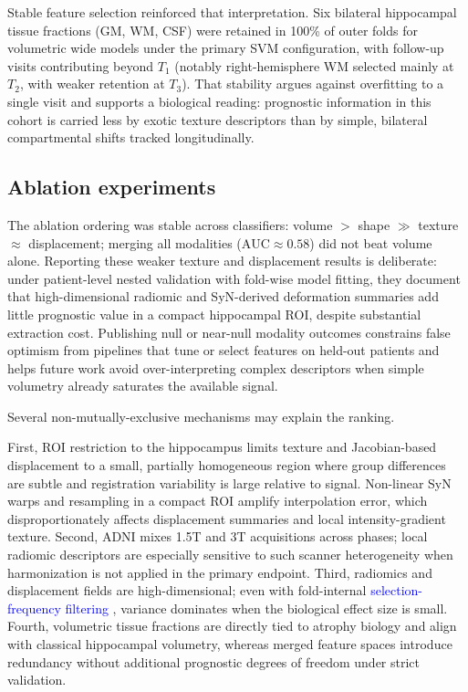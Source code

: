 \documentclass[review]{elsarticle}
\newcommand{\corrigir}[2]{%
	\textcolor{red}{\sout{#1}} %
	\textcolor{blue}{#2}%
}
\begin{document}
	Stable feature selection reinforced that interpretation. Six bilateral hippocampal tissue fractions (GM, WM, CSF) were retained in 100\% of outer folds for volumetric wide models under the primary SVM configuration, with follow-up visits contributing beyond $T_1$ (notably right-hemisphere WM selected mainly at $T_2$, with weaker retention at $T_3$). That stability argues against overfitting to a single visit and supports a biological reading: prognostic information in this cohort is carried less by exotic texture descriptors than by simple, bilateral compartmental shifts tracked longitudinally.
	
	\subsection{Ablation experiments}
	
	The ablation ordering was stable across classifiers: volume $>$ shape $\gg$ texture $\approx$ displacement; merging all modalities ($\mathrm{AUC}\approx 0.58$) did not beat volume alone. Reporting these weaker texture and displacement results is deliberate: under patient-level nested validation with fold-wise model fitting, they document that high-dimensional radiomic and SyN-derived deformation summaries add little prognostic value in a compact hippocampal ROI, despite substantial extraction cost. Publishing null or near-null modality outcomes constrains false optimism from pipelines that tune or select features on held-out patients and helps future work avoid over-interpreting complex descriptors when simple volumetry already saturates the available signal.
	
	Several non-mutually-exclusive mechanisms may explain the ranking.
	
	First, ROI restriction to the hippocampus limits texture and Jacobian-based displacement to a small, partially homogeneous region where group differences are subtle and registration variability is large relative to signal. Non-linear SyN warps and resampling in a compact ROI amplify interpolation error, which disproportionately affects displacement summaries and local intensity-gradient texture. Second, ADNI mixes 1.5T and 3T acquisitions across phases; local radiomic descriptors are especially sensitive to such scanner heterogeneity when harmonization is not applied in the primary endpoint. Third, radiomics and displacement fields are high-dimensional; even with fold-internal \corrigir{}{selection-frequency filtering}, variance dominates when the biological effect size is small. Fourth, volumetric tissue fractions are directly tied to atrophy biology and align with classical hippocampal volumetry, whereas merged feature spaces introduce redundancy without additional prognostic degrees of freedom under strict validation.
	
\end{document}
